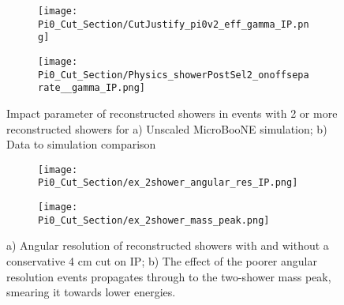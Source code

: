 \begin{figure}[H]
\centering
  \begin{subfigure}[t]{0.35\textwidth}
    \centering
\texttt{[image: Pi0\_Cut\_Section/CutJustify\_pi0v2\_eff\_gamma\_IP.png]}
  \caption{ }
  \end{subfigure} 
  \hspace{20mm}
  \begin{subfigure}[t]{0.35\textwidth}
    \centering
\texttt{[image: Pi0\_Cut\_Section/Physics\_showerPostSel2\_onoffseparate\_\_gamma\_IP.png]}
  \caption{ }
  \end{subfigure} 
\caption{ Impact parameter of reconstructed showers in events with 2 or more reconstructed showers for a) Unscaled MicroBooNE simulation; b) Data to simulation comparison }
\label{fig:cutjust_pi0_IP}
\end{figure}

\begin{figure}[H]
\centering
  \begin{subfigure}[t]{0.25\textwidth}
    \centering
\texttt{[image: Pi0\_Cut\_Section/ex\_2shower\_angular\_res\_IP.png]}
  \caption{ }
  \end{subfigure} 
  \hspace{40mm}
  \begin{subfigure}[t]{0.25\textwidth}
    \centering
\texttt{[image: Pi0\_Cut\_Section/ex\_2shower\_mass\_peak.png]}
  \caption{ }
  \end{subfigure} 
\caption{ a) Angular resolution of reconstructed showers with and without a conservative 4 cm cut on IP; b) The effect of the poorer angular resolution events propagates through to the two-shower mass peak, smearing it towards lower energies. }
\label{fig:ex_cutjust_IP}
\end{figure}

